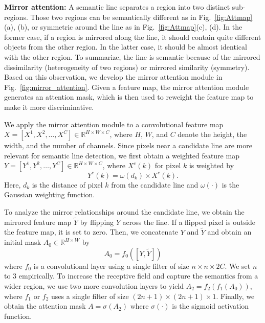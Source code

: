 \documentclass[runningheads]{llncs}
\begin{document}
\noindent\textbf{Mirror attention:} A semantic line separates a region into two distinct sub-regions. Those two regions can be semantically different as in Fig.~\ref{fig:Attmap}(a), (b), or symmetric around the line as in Fig.~\ref{fig:Attmap}(c), (d). In the former case, if a region is mirrored along the line, it should contain quite different objects from the other region. In the latter case, it should be almost identical with the other region. To summarize, the line is semantic because of the mirrored dissimilarity (heterogeneity of two regions) or mirrored similarity (symmetry). Based on this observation, we develop the mirror attention module in Fig.~\ref{fig:mirror_attention}. Given a feature map, the mirror attention module generates an attention mask, which is then used to reweight the feature map to make it more discriminative.


We apply the mirror attention module to a convolutional feature map $X=[X^1, X^2, \ldots, X^C]\in \mathbb{R}^{H\times W\times C}$, where $H$, $W$, and $C$ denote the height, the width, and the number of channels. Since pixels near a candidate line are more relevant for semantic line detection, we first obtain a weighted feature map $Y=[Y^1, Y^2, \ldots, Y^C]\in \mathbb{R}^{H\times W\times C}$, where $X^c(k)$ for pixel $k$ is weighted by
\begin{equation}\label{eq:filter}
    Y^c({k}) = \omega(d_k)\times X^c({k}).
\end{equation}
Here, $d_k$ is the distance of pixel $k$ from the candidate line and $\omega(\cdot)$ is the Gaussian weighting function.

To analyze the mirror relationships around the candidate line, we obtain the mirrored feature map $\tilde{Y}$ by flipping $Y$ across the line. If a flipped pixel is outside the feature map, it is set to zero. Then, we concatenate $Y$ and $\tilde{Y}$ and obtain an initial mask $A_0\in \mathbb{R}^{H\times W}$ by
\begin{equation}\label{eq:channel_conv}
    A_0 = f_0([Y, \tilde{Y}])
\end{equation}
where $f_0$ is a convolutional layer using a single filter of size $n\times n\times 2C$. We set $n$ to 3 empirically. To increase the receptive field and capture the semantics from a wider region, we use two more convolution layers to yield $A_2 = f_2(f_1(A_0))$, where $f_1$ or $f_2$ uses a single filter of size $(2n+1)\times (2n+1)\times 1$. Finally, we obtain the attention mask $A=\sigma(A_2)$ where $\sigma(\cdot)$ is the sigmoid activation function.
\end{document}
